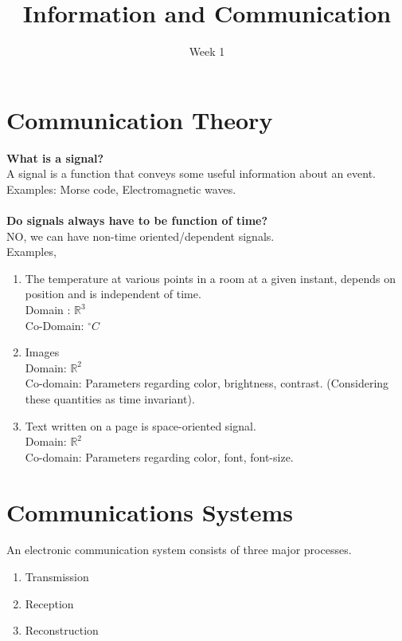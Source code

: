 \documentclass{article}
\title{ \Huge Information and Communication}
\author{Week 1}
\date{}
\begin{document}
\maketitle
\section{Communication Theory}
\Large
\textbf{What is a signal?}\\
A signal is a function that conveys some useful information about an event.\\
Examples: Morse code, Electromagnetic waves.\\
\\
\textbf{Do signals always have to be function of time?}\\
NO, we can have non-time oriented/dependent signals.\\
Examples,
\begin{enumerate}
    \item The temperature at various points in a room at a given instant, depends on position and is independent of time.\\
    Domain : $\mathbb{R}^{3}$\\ 
    Co-Domain: $^{\circ}C$
    \item Images\\
     Domain: $\mathbb{R}^2$\\
     Co-domain: Parameters regarding color, brightness, contrast. (Considering these quantities as time invariant).
    \item Text written on a page is space-oriented signal.\\
    Domain: $\mathbb{R}^2$\\
    Co-domain: Parameters regarding color, font, font-size.

\end{enumerate}
\section{Communications Systems}
\Large
An electronic communication system consists of three major processes.
\begin{enumerate}
    \item Transmission
    \item Reception
    \item Reconstruction
\end{enumerate}
\newpage
\LARGE
\end{document}
